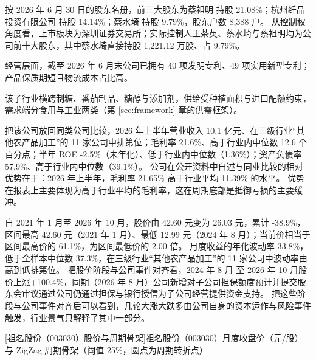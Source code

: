  按 2026 年 6 月 30 日的股东名册，前三大股东为蔡祖明 持股 21.08\%；杭州纤品投资有限公司 持股 14.14\%；蔡水埼 持股 9.79\%，股东户数 8,388 户。 从控制权角度看，上市板块为深圳证券交易所；实际控制人王茶英、蔡水埼与蔡祖明均为公司前十大股东，其中蔡水埼直接持股 1,221.12 万股、占 9.79\%。

 经营层面，截至 2026 年 6 月末公司已拥有 40 项发明专利、49 项实用新型专利；产品保质期短且物流成本占比高。

 该子行业横跨制糖、番茄制品、糖醇与添加剂，供给受种植面积与进口配额约束，需求端分食用与工业两类（第 \ref{sec:framework} 章的供需框架）。

 把该公司放回同类公司比较，2026 年上半年营业收入 10.1 亿元、在三级行业“其他农产品加工”的 11 家公司中排第位；毛利率 21.6\%、高于行业内中位数 12.6 个百分点；半年 ROE -2.5\%（未年化）、低于行业内中位数（1.36\%）；资产负债率 57.9\%、高于行业内中位数（39.1\%）。 公司在公开资料中自述与同业比较的相对优势在于：2026 年上半年，毛利率 21.65\% 高于行业平均 11.39\% 的水平。 优势在报表上主要体现为高于行业平均的毛利率，这在周期底部是抵御亏损的主要缓冲。

 自 2021 年 1 月至 2026 年 10 月，股价由 42.60 元变为 26.03 元，累计 -38.9\%，区间最高 42.60 元（2021 年 1 月）、最低 12.99 元（2024 年 8 月）；当前价相当于区间最高价的 61.1\%，为区间最低价的 2.00 倍。 月度收益的年化波动率 33.8\%，低于全样本中位数 37.3\%，在三级行业“其他农产品加工”的 11 家公司中波动率由高到低排第位。 把股价阶段与公司事件对齐看，2024 年 8 月 至 2026 年 10 月股价上涨+100.4\%，同期（2026 年 8 月）公司新增对子公司担保额度预计并提交股东会审议通过公司仍通过担保与银行授信为子公司经营提供资金支持。 把这些阶段与公司事件对齐后可以看到，几轮大涨大跌多由公司自身的资本运作与风险事件触发，行业景气只解释了其中一部分。

\begin{center}
\begin{minipage}{\textwidth}\centering
{}

[祖名股份（003030）股价与周期骨架]{祖名股份（003030）月度收盘价（元/股）与 ZigZag 周期骨架（阈值 25\%，圆点为周期转折点）}
\end{minipage}
\end{center}

